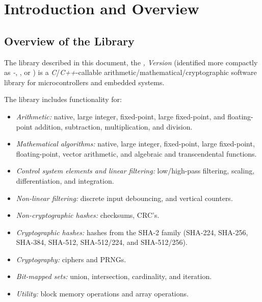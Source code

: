 \chapter{Introduction and Overview}
\label{ciov0}

\section{Overview of the Library}
\label{ciov0:sdpr0}

The library described in this 
document, the \emph{\productbasenamelong{}, Version 
\productversion{}} (identified more compactly as 
\emph{\productbasenameshort{}-\productversion{}}, 
\emph{\productbasenameshort{}}, or 
\emph{\productbasenameultrashort{}}) is a 
\emph{C}/\emph{C++}-callable 
arith\-me\-tic/\-math\-e\-mat\-i\-cal/\-cryp\-to\-graph\-ic 
software library for microcontrollers and embedded systems.  

The library includes functionality for: 

\begin{itemize}
\item \emph{Arithmetic:}
      native, large integer, fixed-point, large fixed-point,
      and float\-ing-point addition, subtraction,
      multiplication, and division.
\item \emph{Mathematical algorithms:}
      native, large integer, fixed-point, large fixed-point,
      floating-point, vector arithmetic, and algebraic 
      and transcendental functions.
\item \emph{Control system elements and linear filtering:}
      low/high-pass filtering, scaling, differentiation,
      and integration.
\item \emph{Non-linear filtering:}
      discrete input debouncing, and vertical counters.
\item \emph{Non-cryptographic hashes:}
      checksums, CRC's.
\item \emph{Cryptographic hashes:}
      hashes from the SHA-2 family (SHA-224, SHA-256,
      SHA-384, SHA-512, SHA-512/224, and SHA-512/256).
\item \emph{Cryptography:}
      ciphers and PRNGs.
\item \emph{Bit-mapped sets:}
      union, intersection, cardinality, and iteration.
\item \emph{Utility:}
      block memory
      operations and array operations.
\end{itemize}

